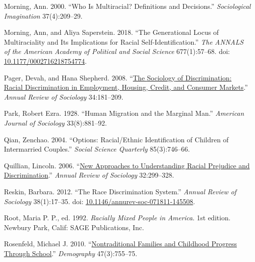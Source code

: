 \documentclass[
  letterpaper,
  DIV=11,
  numbers=noendperiod]{scrartcl}
\newlength{\cslhangindent}
\newlength{\cslentryspacingunit} %
\newenvironment{CSLReferences}[2] %
 {%
  \setlength{\parindent}{0pt}
  \ifodd #1
  \let\oldpar\par
  \def\par{\hangindent=\cslhangindent\oldpar}
  \fi
  \setlength{\parskip}{#2\cslentryspacingunit}
 }%
 {}
\begin{document}
\begin{CSLReferences}{1}{0}
\leavevmode{}%
Morning, Ann. 2000. {``Who Is {Multiracial}? {Definitions} and
{Decisions}.''} \emph{Sociological Imagination} 37(4):209--29.

\leavevmode{}%
Morning, Ann, and Aliya Saperstein. 2018. {``The {Generational Locus} of
{Multiraciality} and {Its Implications} for {Racial
Self-Identification}.''} \emph{The ANNALS of the American Academy of
Political and Social Science} 677(1):57--68. doi:
\href{https://doi.org/10.1177/0002716218754774}{10.1177/0002716218754774}.

\leavevmode{}%
Pager, Devah, and Hana Shepherd. 2008.
{``\href{https://www.ncbi.nlm.nih.gov/pmc/articles/PMC2915460}{The
{Sociology} of {Discrimination}: {Racial Discrimination} in
{Employment}, {Housing}, {Credit}, and {Consumer Markets}}.''}
\emph{Annual Review of Sociology} 34:181--209.

\leavevmode{}%
Park, Robert Ezra. 1928. {``Human {Migration} and the {Marginal Man}.''}
\emph{American Journal of Sociology} 33(8):881--92.

\leavevmode{}%
Qian, Zenchao. 2004. {``Options: {Racial}/{Ethnic Identification} of
{Children} of {Intermarried Couples}.''} \emph{Social Science Quarterly}
85(3):746--66.

\leavevmode{}%
Quillian, Lincoln. 2006.
{``\href{https://www.jstor.org/stable/29737741}{New {Approaches} to
{Understanding Racial Prejudice} and {Discrimination}}.''} \emph{Annual
Review of Sociology} 32:299--328.

\leavevmode{}%
Reskin, Barbara. 2012. {``The {Race Discrimination System}.''}
\emph{Annual Review of Sociology} 38(1):17--35. doi:
\href{https://doi.org/10.1146/annurev-soc-071811-145508}{10.1146/annurev-soc-071811-145508}.

\leavevmode{}%
Root, Maria P. P., ed. 1992. \emph{Racially {Mixed People} in
{America}}. 1st edition. {Newbury Park, Calif}: {SAGE Publications,
Inc}.

\leavevmode{}%
Rosenfeld, Michael J. 2010.
{``\href{https://www.ncbi.nlm.nih.gov/pmc/articles/PMC3000058}{Nontraditional
{Families} and {Childhood Progress Through School}}.''}
\emph{Demography} 47(3):755--75.


\end{CSLReferences}
\end{document}
